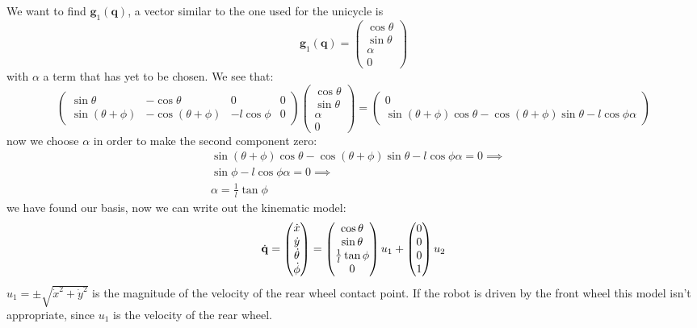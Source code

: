 \documentclass[10pt, a4paper]{report}
\newcommand{\q}{{\mathbf q}}
\begin{document}
We want to find $\mathbf g_1(\q)$, a vector similar to the one used for the unicycle is\begin{equation}\mathbf g_1(\q)=\begin{pmatrix}
    \cos\theta\\\sin\theta\\\alpha\\0
\end{pmatrix}
\end{equation}
with $\alpha$ a term that has yet to be chosen. We see that:\begin{equation}
    \begin{pmatrix}
        \sin\theta&-\cos\theta&0&0\\ 
        \sin(\theta+\phi)&-\cos(\theta+\phi)&-l\cos\phi&0
    \end{pmatrix}\begin{pmatrix}
    \cos\theta\\\sin\theta\\\alpha\\0
\end{pmatrix}=\begin{pmatrix}
    0\\ 
     \sin(\theta+\phi)\cos\theta-\cos(\theta+\phi)\sin\theta-l\cos\phi\alpha
\end{pmatrix}
\end{equation}
now we choose $\alpha$ in order to make the second component zero:\begin{align}
     &\sin(\theta+\phi)\cos\theta-\cos(\theta+\phi)\sin\theta-l\cos\phi\alpha=0\implies\\
     &\sin\phi-l\cos\phi\alpha=0\implies \\ 
     &\alpha=\frac{1}{l}\tan\phi 
\end{align}
we have found our basis, now we can write out the kinematic model:\begin{equation}
    {\dot{\mathbf q}}=\begin{pmatrix}
        \dot x\\ \dot y \\ \dot\theta\\\dot\phi
    \end{pmatrix}=\begin{pmatrix}
        \cos\theta\\\sin\theta\\\frac{1}{l}\tan\phi \\0
    \end{pmatrix}u_1+\begin{pmatrix}
        0\\0\\0\\1 
    \end{pmatrix}u_2
\end{equation}
$u_1=\pm\sqrt{\dot x^2+\dot y^2}$ is the magnitude of the velocity of the rear wheel contact point. If the robot is driven by the front wheel this model isn't appropriate, since $u_1$ is the velocity of the rear wheel.\bigskip
\end{document}
